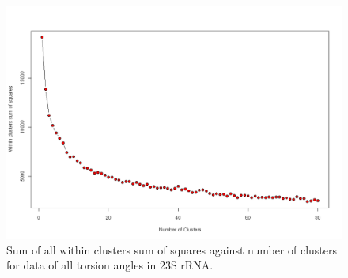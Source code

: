\begin{figure}[H]
\centering
\includegraphics[angle=0, scale=0.35]{Chapter2/hartigan_nuclu_b.png}
\caption{Sum of all within clusters sum of squares against number of 
 clusters for data of all torsion angles in 23S rRNA.}
\label{fig:wss}
\end{figure}

